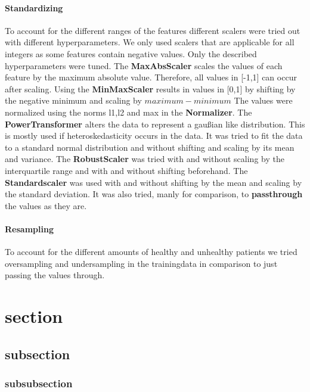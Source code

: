\paragraph{Standardizing} 
To account for the different ranges of the features different scalers were tried out with different hyperparameters. We only used scalers that are applicable for all integers as some features contain negative values. Only the described hyperparameters were tuned. \newline
The \textbf{MaxAbsScaler} scales the values of each feature by the maximum absolute value. Therefore, all values in [-1,1] can occur after scaling. \newline
Using the \textbf{MinMaxScaler} results in values in [0,1] by shifting by the negative minimum and scaling by $maximum - minimum$\newline
The values were normalized using the norms l1,l2 and max in the \textbf{Normalizer}. \newline
The \textbf{PowerTransformer} alters the data to represent a gaußian like distribution. This is mostly used if heteroskedasticity occurs in the data. It was tried to fit the data to a standard normal distribution and without shifting and scaling by its mean and variance. \newline
The \textbf{RobustScaler} was tried with and without scaling by the interquartile range and with and without shifting beforehand.\newline
The \textbf{Standardscaler} was used with and without shifting by the mean and scaling by the standard deviation.\newline
It was also tried, manly for comparison, to \textbf{passthrough} the values as they are.\newline

\paragraph{Resampling}
To account for the different amounts of healthy and unhealthy patients we tried oversampling and undersampling in the trainingdata in comparison to just passing the values through.



\section{section }
\subsection{subsection }
\subsubsection{subsubsection }


